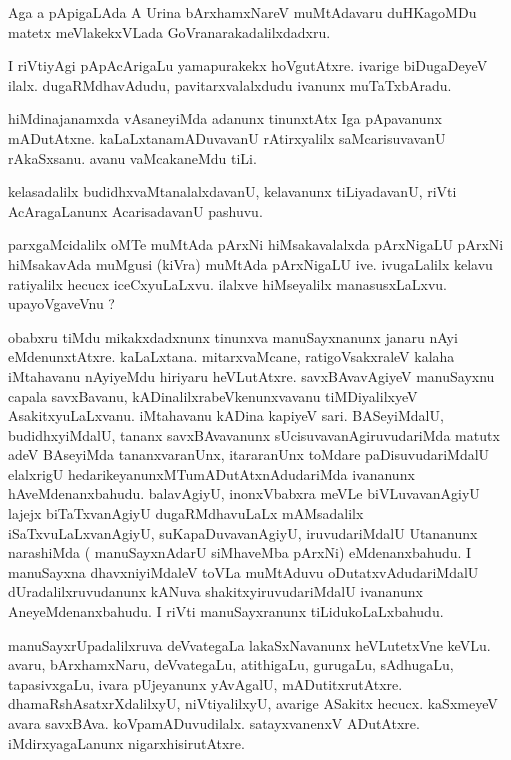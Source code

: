 \documentclass{article}
\begin{document}
\begin{mng}%
Aga a pApigaLAda A Urina bArxhamxNareV muMtAdavaru duHKagoMDu matetx meVlakekxVLada 
GoVranarakadalilxdadxru.
\end{mng}

\begin{mng}%
I riVtiyAgi pApAcArigaLu yamapurakekx hoVgutAtxre. ivarige biDugaDeyeV ilalx. dugaRMdhavAdudu, 
pavitarxvalalxdudu ivanunx muTaTxbAradu.
\end{mng}

\begin{mng}%
hiMdinajanamxda vAsaneyiMda adanunx tinunxtAtx Iga pApavanunx mADutAtxne. kaLaLxtanamADuvavanU 
rAtirxyalilx saMcarisuvavanU rAkaSxsanu. avanu vaMcakaneMdu tiLi.
\end{mng}

\begin{mng}%
kelasadalilx budidhxvaMtanalalxdavanU, kelavanunx tiLiyadavanU, riVti AcAragaLanunx AcarisadavanU 
pashuvu.
\end{mng}

\begin{mng}%
parxgaMcidalilx oMTe muMtAda pArxNi hiMsakavalalxda pArxNigaLU pArxNi hiMsakavAda muMgusi (kiVra) 
muMtAda pArxNigaLU ive. ivugaLalilx kelavu ratiyalilx hecucx  iceCxyuLaLxvu. ilalxve hiMseyalilx 
manasusxLaLxvu. upayoVgaveVnu ?
\end{mng}

\begin{mng}%
obabxru tiMdu mikakxdadxnunx tinunxva manuSayxnanunx janaru nAyi eMdenunxtAtxre. kaLaLxtana. 
mitarxvaMcane, ratigoVsakxraleV kalaha iMtahavanu nAyiyeMdu hiriyaru heVLutAtxre. savxBAvavAgiyeV 
manuSayxnu capala savxBavanu, kADinalilxrabeVkenunxvavanu tiMDiyalilxyeV AsakitxyuLaLxvanu. 
iMtahavanu kADina kapiyeV sari. BASeyiMdalU, budidhxyiMdalU, tananx savxBAvavanunx 
sUcisuvavanAgiruvudariMda matutx adeV BAseyiMda tananxvaranUnx, itararanUnx toMdare 
paDisuvudariMdalU elalxrigU hedarikeyanunxMTumADutAtxnAdudariMda ivananunx hAveMdenanxbahudu. 
balavAgiyU, inonxVbabxra meVLe biVLuvavanAgiyU lajejx biTaTxvanAgiyU dugaRMdhavuLaLx mAMsadalilx 
iSaTxvuLaLxvanAgiyU, suKapaDuvavanAgiyU, iruvudariMdalU Utananunx narashiMda ( manuSayxnAdarU 
siMhaveMba pArxNi) eMdenanxbahudu. I manuSayxna dhavxniyiMdaleV toVLa muMtAduvu 
oDutatxvAdudariMdalU dUradalilxruvudanunx kANuva shakitxyiruvudariMdalU ivananunx 
AneyeMdenanxbahudu. I riVti manuSayxranunx tiLidukoLaLxbahudu.
\end{mng}

\begin{mng}%
manuSayxrUpadalilxruva deVvategaLa lakaSxNavanunx heVLutetxVne keVLu. avaru, bArxhamxNaru, 
deVvategaLu, atithigaLu, gurugaLu, sAdhugaLu, tapasivxgaLu, ivara pUjeyanunx yAvAgalU, 
mADutitxrutAtxre. dhamaRshAsatxrXdalilxyU, niVtiyalilxyU, avarige ASakitx hecucx. kaSxmeyeV avara 
savxBAva. koVpamADuvudilalx. satayxvanenxV ADutAtxre. iMdirxyagaLanunx nigarxhisirutAtxre.
\end{mng}
\end{document}
